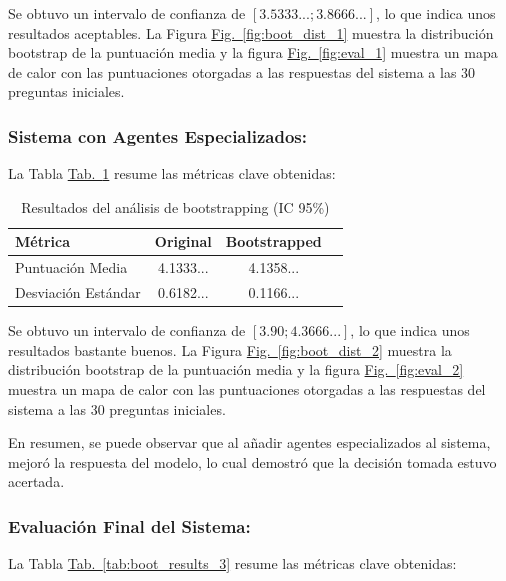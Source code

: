 \documentclass[10pt]{llncs}
\newcommand{\figref}[1]{\hyperref[#1]{Fig.~\ref*{#1}}}
\newcommand{\tabref}[1]{\hyperref[#1]{Tab.~\ref*{#1}}}
\begin{document}
\begin{remark}
Se obtuvo un intervalo de confianza de $[3.5333...; 3.8666...]$, lo que indica unos resultados aceptables. 
La Figura {\figref{fig:boot_dist_1}} muestra la distribución bootstrap de la puntuación media y la figura
{\figref{fig:eval_1}} muestra un mapa de calor con las puntuaciones otorgadas a las respuestas del sistema a las 
30 preguntas iniciales.
\end{remark}

\subsubsection{Sistema con Agentes Especializados:}

La Tabla \tabref{tab:boot_results_2} resume las métricas clave obtenidas:

\begin{table}[h]
\centering
\caption{Resultados del análisis de bootstrapping (IC 95\%)}
\label{tab:boot_results_2}
\begin{tabular}{lccc}
\hline
\textbf{Métrica} & \textbf{Original} & \textbf{Bootstrapped}  \\
\hline 
Puntuación Media& 4.1333... & 4.1358...  \\
Desviación Estándar & 0.6182... & 0.1166...  \\
\hline
\end{tabular}
\end{table}

\begin{remark}
Se obtuvo un intervalo de confianza de $[3.90;4.3666...]$, lo que indica unos resultados bastante buenos. 
La Figura {\figref{fig:boot_dist_2}} muestra la distribución bootstrap de la puntuación media y la figura 
{\figref{fig:eval_2}} muestra un mapa de calor con las puntuaciones otorgadas a las respuestas del sistema a las 
30 preguntas iniciales.
\end{remark}

En resumen, se puede observar que al añadir agentes especializados al sistema, mejoró la respuesta del modelo, lo cual demostró 
que la decisión tomada estuvo acertada.

\subsubsection{Evaluación Final del Sistema:}

La Tabla \tabref{tab:boot_results_3} resume las métricas clave obtenidas:
\end{document}
